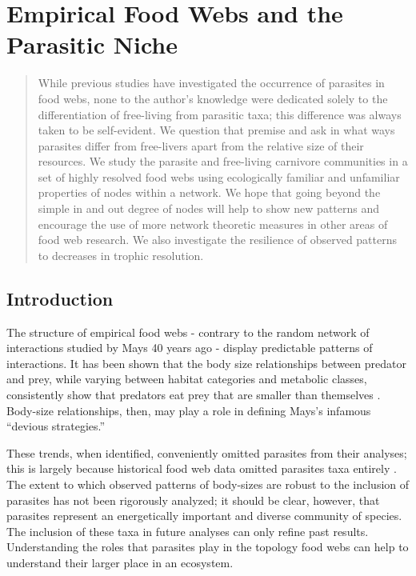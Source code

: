 \documentclass[../dissertation.tex]{subfiles}
\title{}
\begin{document}
\maketitle

\chapter{Empirical Food Webs and the Parasitic Niche}

\begin{abstract}
While previous studies have investigated the occurrence of parasites in food
webs, none to the author's knowledge were dedicated solely to the
differentiation of free-living from parasitic taxa; this difference was always
taken to be self-evident. We question that premise and ask in what ways
parasites differ from free-livers apart from the relative size of their
resources. We study the parasite and free-living carnivore communities in a set
of highly resolved food webs using ecologically familiar and unfamiliar
properties of nodes within a network. We hope that going beyond the simple in
and out degree of nodes will help to show new patterns and encourage the use of
more network theoretic measures in other areas of food web research. We also
investigate the resilience of observed patterns to decreases in trophic
resolution.
\end{abstract}

\section{Introduction}

The structure of empirical food webs - contrary to the random network of interactions
studied by Mays 40 years ago - display predictable patterns of interactions.
It has been shown that the body size relationships between predator and prey,
while varying between habitat categories and metabolic classes, consistently
show that predators eat prey that are smaller than themselves
\cite{Brose2006a}. Body-size relationships, then, may play a role in defining
Mays's infamous ``devious strategies.'' 

These trends, when identified, conveniently omitted parasites from their
analyses; this is largely because historical food web data omitted parasites
taxa entirely \cite{Marcogliese1997}. The extent to which observed patterns of
body-sizes are robust to the inclusion of parasites has not been rigorously
analyzed; it should be clear, however, that parasites represent an
energetically important and diverse community of species. The inclusion of
these taxa in future analyses can only refine past results. Understanding the
roles that parasites play in the topology food webs can help to understand
their larger place in an ecosystem.
\end{document}
